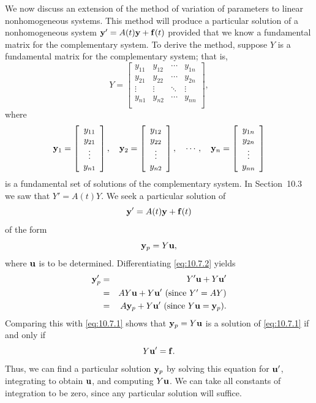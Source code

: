 \noindent
We now discuss an extension of the method of variation of parameters to linear nonhomogeneous
systems. This method will produce a particular solution of a nonhomogeneous system
${\bf y}'=A(t){\bf y}+{\bf f}(t)$ provided that we know a fundamental matrix for the complementary
system. To derive the method, suppose $Y$ is a fundamental matrix for the complementary system; that
is,
\[
  Y=\left[
  \begin{array}{cccc}
    y_{11} & y_{12} & \cdots & y_{1n} \\
    y_{21} & y_{22} & \cdots & y_{2n} \\
    \vdots & \vdots & \ddots & \vdots \\
    y_{n1} & y_{n2} & \cdots & y_{nn} \\
  \end{array}\right],
\]
where
\[
  {\bf y}_{1}=\left[
  \begin{array}{c}
    y_{11} \\
    y_{21} \\
    \vdots \\
    y_{n1}
  \end{array}\right],\quad{\bf y}_{2}=\left[
  \begin{array}{c}
    y_{12} \\
    y_{22} \\
    \vdots \\
    y_{n2}
  \end{array}\right],\quad\cdots,\quad{\bf y}_{n}=\left[
  \begin{array}{c}
    y_{1n} \\
    y_{2n} \\
    \vdots \\
    y_{nn}
  \end{array}\right]
\]
is a fundamental set of solutions of the complementary system. In Section~10.3 we saw that
$Y'=A(t)Y$. We seek a particular solution of
\begin{equation}
  \label{eq:10.7.1}{\bf y}'=A(t){\bf y}+{\bf f}(t)
\end{equation}
of the form
\begin{equation}
  \label{eq:10.7.2}{\bf y}_{p}=Y{\bf u},
\end{equation}
where ${\bf u}$ is to be determined. Differentiating \eqref{eq:10.7.2} yields
\begin{eqnarray*}
  {\bf y}_{p}' & = & Y'{\bf u}+Y{\bf u}'                        \\
               & = & AY{\bf u}+Y{\bf u}'\mbox{ (since $Y'=AY$)} \\
               & = & A{\bf y}_{p}+Y{\bf u}'\mbox{ (since $Y{\bf u}={\bf y}_{p}$)}.
\end{eqnarray*}
Comparing this with \eqref{eq:10.7.1} shows that ${\bf y}_{p}=Y{\bf u}$ is a solution of
\eqref{eq:10.7.1} if and only if
\[
  Y{\bf u}'={\bf f}.
\]
Thus, we can find a particular solution ${\bf y}_{p}$ by solving this equation for ${\bf u}'$,
integrating to obtain ${\bf u}$, and computing $Y{\bf u}$. We can take all constants of integration
to be zero, since any particular solution will suffice.

